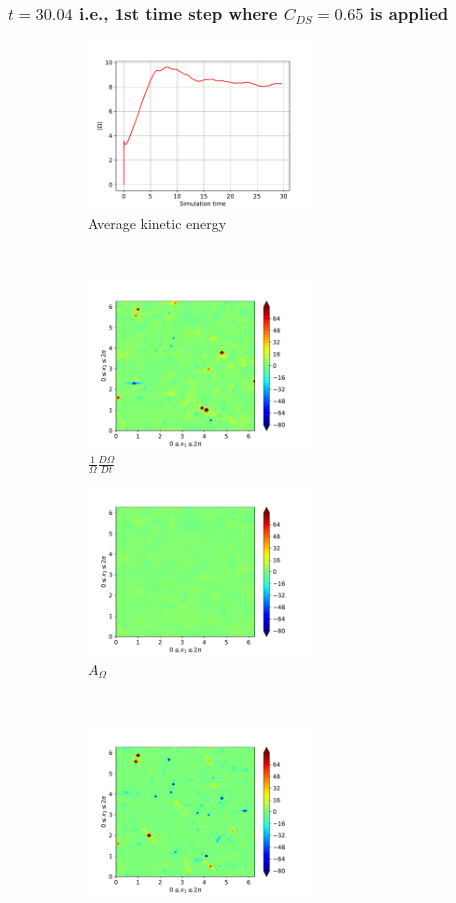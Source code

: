 \subsubsection{$t=30.04$ i.e., 1st time step where $C_{DS}=0.65$ is applied} 
\begin{figure}[H]
    \begin{subfigure}[H]{0.45\textwidth}
        \includegraphics[height=1.75in]{media/run-cds-65/enst-average1330}
        \caption{Average kinetic energy}
    \end{subfigure}
    ~
    \begin{subfigure}[H]{0.45\textwidth}
        \includegraphics[height=1.75in]{media/run-cds-65/enst-1330}
        \caption{$\frac{1}{\Omega} \frac{D \Omega}{Dt}$}
    \end{subfigure}
    \newline
    \begin{subfigure}{0.45\textwidth}
        \includegraphics[height=1.75in]{media/run-cds-65/A-enst-1330}
        \caption{$A_{\Omega}$}
    \end{subfigure}
    ~
    \begin{subfigure}{0.45\textwidth}
        \includegraphics[height=1.75in]{media/run-cds-65/Pi-enst-1330}

\end{subfigure}
\end{figure}
